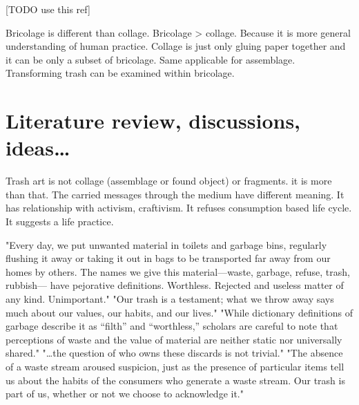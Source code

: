 [TODO use this ref]\cite{strasser1999waste}

Bricolage is different than collage. Bricolage > collage. Because it is more general understanding of human practice. Collage is just only gluing paper together and it can be only a subset of bricolage. Same applicable for assemblage. Transforming trash can be examined within bricolage. 

\section{Literature review, discussions, ideas\ldots}
Trash art is not collage (assemblage or found object) or fragments. it is more than that. The carried messages through the medium have different meaning. It has relationship with activism, craftivism. It refuses consumption based life cycle. It suggests a life practice.

"Every day, we put unwanted material in toilets and garbage bins, regularly flushing it away or taking it out in bags to be transported far away from our homes by others. The names we give this material---waste, garbage, refuse, trash, rubbish--- have pejorative definitions. Worthless. Rejected and useless matter of any kind. Unimportant." "Our trash is a testament; what we throw away says much about our values, our habits, and our lives." "While dictionary definitions of garbage describe it as “filth” and “worthless,” scholars are careful to note that perceptions of waste and the value of material are neither static nor universally shared." "\ldots the question of who owns these discards is not trivial." "The absence of a waste stream aroused suspicion, just as the presence of particular items tell us about the habits of the consumers who generate a waste stream. Our trash is part of us, whether or not we choose to acknowledge it." \cite{zimring2012encyclopedia}


